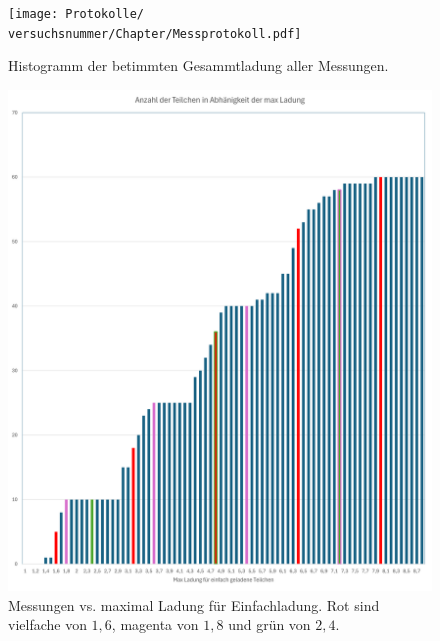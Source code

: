 \onecolumn
\begin{figure}
    \centering
    \hspace*{-2.2cm}
    \texttt{[image: Protokolle/\\versuchsnummer/Chapter/Messprotokoll.pdf]}
    \caption{Histogramm der betimmten Gesammtladung aller Messungen.}
    \label{fig:hist_b}
\end{figure}
\twocolumn
\onecolumn
\begin{figure}[h]
    \centering
    \includegraphics[width=\textwidth]{img/22/Plot_MaxQ.png}
    \caption{Messungen vs. maximal Ladung für Einfachladung. Rot sind vielfache von $1,6$, magenta von $1,8$ und grün von $2,4$.}
    \label{fig:plot_maxq_b}
\end{figure}
\twocolumn
